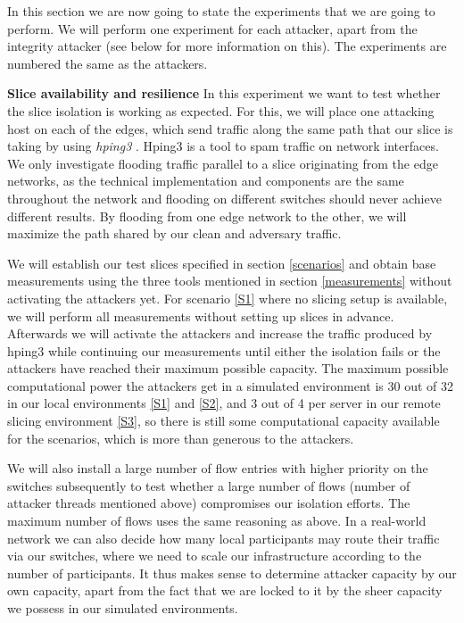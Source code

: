 In this section we are now going to state the experiments that we are going to perform. We will perform one experiment for each attacker, apart from the integrity attacker (see below for more information on this). The experiments are numbered the same as the attackers.

\begin{description}[style=multiline, labelwidth=0.7cm]
    \item[\namedlabel{E1}{E1}] \textbf{Slice availability and resilience} In this experiment we want to test whether the slice isolation is working as expected. For this, we will place one attacking host on each of the edges, which send traffic along the same path that our slice is taking by using \textit{hping3} \cite{hping3}. Hping3 is a tool to spam traffic on network interfaces. We only investigate flooding traffic parallel to a slice originating from the edge networks, as the technical implementation and components are the same throughout the network and flooding on different switches should never achieve different results. By flooding from one edge network to the other, we will maximize the path shared by our clean and adversary traffic.

    We will establish our test slices specified in section \ref{scenarios} and obtain base measurements using the three tools mentioned in section \ref{measurements} without activating the attackers yet. For scenario \ref{S1} where no slicing setup is available, we will perform all measurements without setting up slices in advance. Afterwards we will activate the attackers and increase the traffic produced by hping3 while continuing our measurements until either the isolation fails or the attackers have reached their maximum possible capacity. The maximum possible computational power the attackers get in a simulated environment is 30 out of 32 in our local environments \ref{S1} and \ref{S2}, and 3 out of 4 per server in our remote slicing environment \ref{S3}, so there is still some computational capacity available for the scenarios, which is more than generous to the attackers.

    We will also install a large number of flow entries with higher priority on the switches subsequently to test whether a large number of flows (number of attacker threads mentioned above) compromises our isolation efforts. The maximum number of flows uses the same reasoning as above. In a real-world network we can also decide how many local participants may route their traffic via our switches, where we need to scale our infrastructure according to the number of participants. It thus makes sense to determine attacker capacity by our own capacity, apart from the fact that we are locked to it by the sheer capacity we possess in our simulated environments.


\end{description}
